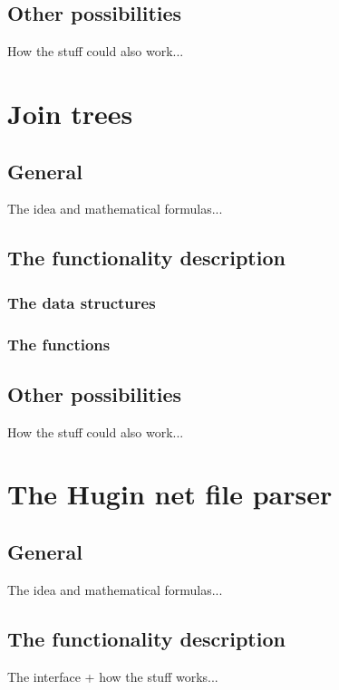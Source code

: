 \documentclass[12pt,a4paper]{report}
\begin{document}
\subsection{Other possibilities}

How the stuff could also work...


\newpage
\section{Join trees} %
\subsection{General}

The idea and mathematical formulas...

\subsection{The functionality description}
\subsubsection{The data structures}

\subsubsection{The functions}


\subsection{Other possibilities}

How the stuff could also work...


\newpage
\section{The Hugin net file parser}
\subsection{General}

The idea and mathematical formulas...

\subsection{The functionality description}

The interface + how the stuff works...
\end{document}
